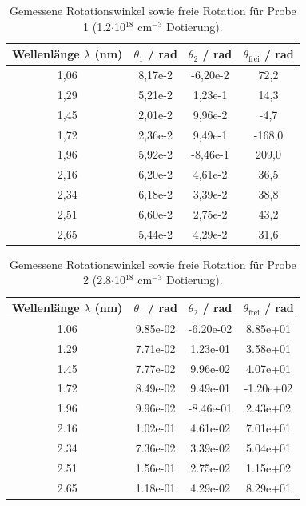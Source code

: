 \begin{table}[H]
    \centering
    \caption{Gemessene Rotationswinkel sowie freie Rotation für Probe 1 (1.2$\cdot$10$^{18}$ cm$^{-3}$ Dotierung).}
    \label{tab:rotationswinkel1}
    \begin{tabular}{c|c|c|c}
        Wellenlänge $\lambda$ (nm) & $\theta_1$ / rad & $\theta_2$ / rad & $\theta_\text{frei}$ / rad \\
        \hline
        1,06 &  8,17e-2 & -6,20e-2 &   72,2 \\
        1,29 &  5,21e-2 &  1,23e-1 &   14,3 \\
        1,45 &  2,01e-2 &  9,96e-2 &   -4,7 \\
        1,72 &  2,36e-2 &  9,49e-1 & -168,0 \\ %
        1,96 &  5,92e-2 & -8,46e-1 &  209,0 \\ %
        2,16 &  6,20e-2 &  4,61e-2 &   36,5 \\
        2,34 &  6,18e-2 &  3,39e-2 &   38,8 \\
        2,51 &  6,60e-2 &  2,75e-2 &   43,2 \\
        2,65 &  5,44e-2 &  4,29e-2 &   31,6 \\
    \end{tabular}
\end{table}
\begin{table}[H]
    \centering
    \caption{Gemessene Rotationswinkel sowie freie Rotation für Probe 2 (2.8$\cdot$10$^{18}$ cm$^{-3}$ Dotierung).}
    \label{tab:rotationswinkel2}
    \begin{tabular}{c|c|c|c}
        Wellenlänge $\lambda$ (nm) & $\theta_1$ / rad & $\theta_2$ / rad & $\theta_\text{frei}$ / rad \\
        \hline
        1.06     & 9.85e-02 & -6.20e-02 & 8.85e+01\\
        1.29     & 7.71e-02 & 1.23e-01 & 3.58e+01\\
        1.45     & 7.77e-02 & 9.96e-02 & 4.07e+01\\
        1.72     & 8.49e-02 & 9.49e-01 & -1.20e+02\\
        1.96     & 9.96e-02 & -8.46e-01 & 2.43e+02\\
        2.16     & 1.02e-01 & 4.61e-02 & 7.01e+01\\
        2.34     & 7.36e-02 & 3.39e-02 & 5.04e+01\\
        2.51     & 1.56e-01 & 2.75e-02 & 1.15e+02   \\
        2.65     & 1.18e-01 & 4.29e-02 & 8.29e+01   \\
    \end{tabular}   
\end{table}
